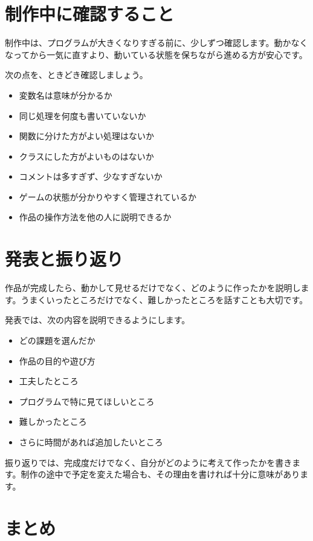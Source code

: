 \section{制作中に確認すること}

制作中は、プログラムが大きくなりすぎる前に、少しずつ確認します。動かなくなってから一気に直すより、動いている状態を保ちながら進める方が安心です。

次の点を、ときどき確認しましょう。

\begin{itemize}
    \item 変数名は意味が分かるか
    \item 同じ処理を何度も書いていないか
    \item 関数に分けた方がよい処理はないか
    \item クラスにした方がよいものはないか
    \item コメントは多すぎず、少なすぎないか
    \item ゲームの状態が分かりやすく管理されているか
    \item 作品の操作方法を他の人に説明できるか
\end{itemize}

\section{発表と振り返り}

作品が完成したら、動かして見せるだけでなく、どのように作ったかを説明します。うまくいったところだけでなく、難しかったところを話すことも大切です。

発表では、次の内容を説明できるようにします。

\begin{itemize}
    \item どの課題を選んだか
    \item 作品の目的や遊び方
    \item 工夫したところ
    \item プログラムで特に見てほしいところ
    \item 難しかったところ
    \item さらに時間があれば追加したいところ
\end{itemize}

振り返りでは、完成度だけでなく、自分がどのように考えて作ったかを書きます。制作の途中で予定を変えた場合も、その理由を書ければ十分に意味があります。

\section{まとめ}

